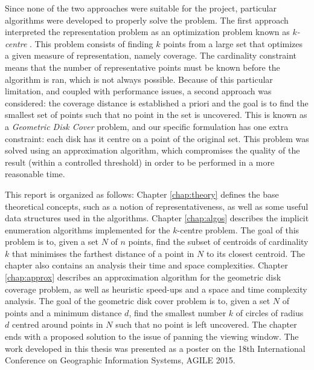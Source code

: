 Since none of the two approaches were suitable for the project, particular algorithms were developed to properly solve the problem. The first approach interpreted the representation problem as an optimization problem known as \emph{$k$-centre} \cite{facilityloc}. This problem consists of finding $k$ points from a large set that optimizes a given measure of representation, namely coverage. The cardinality constraint means that the number of representative points must be known before the algorithm is ran, which is not always possible. Because of this particular limitation, and coupled with performance issues, a second approach was considered: the coverage distance is established a priori and the goal is to find the smallest set of points such that no point in the set is uncovered. This is known as a \emph{Geometric Disk Cover} \cite{gdccomplex} problem, and our specific formulation has one extra constraint: each disk has it centre on a point of the original set. This problem was solved using an approximation algorithm, which compromises the quality of the result (within a controlled threshold) in order to be performed in a more reasonable time. 

This report is organized as follows:
Chapter \ref{chap:theory} defines the base theoretical concepts, such as a notion of representativeness, as well as some useful data structures used in the algorithms. Chapter \ref{chap:algos} describes the implicit enumeration algorithms implemented for the $k$-centre problem. The goal of this problem is to, given a set $N$ of $n$ points, find the subset of centroids of cardinality $k$ that minimises the farthest distance of a point in $N$ to its closest centroid. The chapter also contains an analysis their time and space complexities. Chapter \ref{chap:approx} describes an approximation algorithm for the geometric disk coverage problem, as well as heuristic speed-ups and a space and time complexity analysis. The goal of the geometric disk cover problem is to, given a set $N$ of points and a minimum distance $d$, find the smallest number $k$ of circles of radius $d$ centred around points in $N$ such that no point is left uncovered. The chapter ends with a proposed solution to the issue of panning the viewing window. The work developed in this thesis was presented as a poster \cite{valenca} on the 18th International Conference on Geographic Information Systems, AGILE 2015.